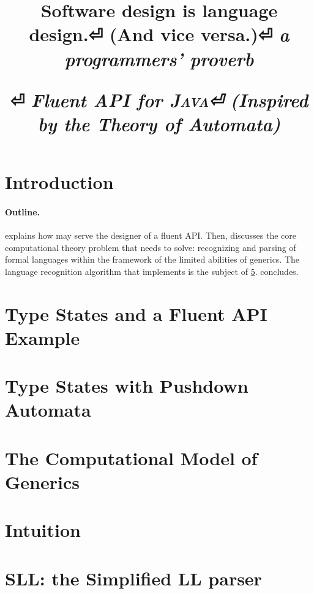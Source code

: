 \documentclass[nonatbib,preprint,numbers]{sigplanconf}
\title{%
\begin{flushright}
  \scriptsize\bfseries
  Software design is language design.⏎
    (And vice versa.)⏎
  \footnotesize\mdseries\itshape
   a programmers' proverb
\end{flushright}
  \Huge \Fajita⏎
  \huge \itshape \textbf Fluent \textbf API for \textsc{\textbf Java}⏎
  \LARGE (\textbf Inspired by the \textbf Theory of \textbf Automata)
}
\begin{document}
\maketitle

\begin{abstract}
  
\end{abstract}

\section{Introduction}


\paragraph{Outline.}

explains how \Fajita may serve the designer of a fluent API\@.
Then,  discusses
the core computational theory problem that \Fajita
needs to solve: recognizing and parsing of formal languages
within the framework of the limited abilities of \Java
generics.
The language recognition algorithm that \Fajita
implements is the subject of \cref{section:intuition}.
 concludes.

\section{Type States and a Fluent API Example}
\label{section:example}


\section{Type States with Pushdown Automata}
\label{section:generalization}


\section{The Computational Model of \protect\Java Generics}
\label{section:background}


\section{Intuition}
\label{section:intuition}


\section{SLL: the Simplified LL parser}
\label{section:sll}

\end{document}
